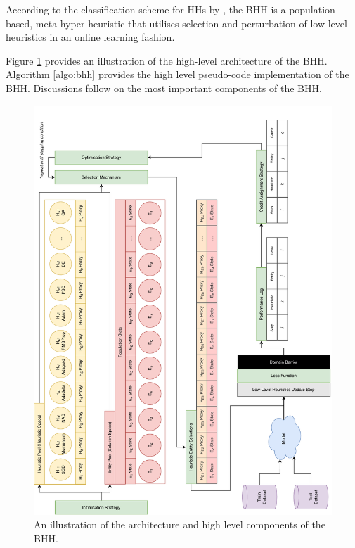 \documentclass[preprint,review,12pt]{elsarticle}
\begin{document}
According to the classification scheme for \acp{HH} by \citet{ref:burke:2010}, the \acs{BHH} is a population-based, meta-hyper-heuristic that utilises selection and perturbation of low-level heuristics in an online learning fashion.

Figure \ref{fig:bhh_architecture} provides an illustration of the high-level architecture of the \acs{BHH}. Algorithm \ref{algo:bhh} provides the high level pseudo-code implementation of the \acs{BHH}. Discussions follow on the most important components of the \acs{BHH}.

\begin{figure}[htbp]
	\centering
	\includegraphics[width=1.0\textwidth]{bhh_architecture.pdf}
	\caption[An illustration of
		the architecture and high level components of the \acf{BHH}.]{An illustration of
		the architecture and high level components of the \acf{BHH}.}
	\label{fig:bhh_architecture}
\end{figure}
\end{document}
